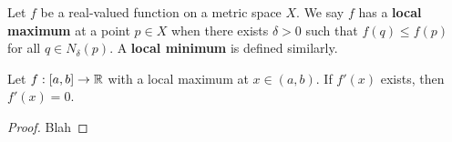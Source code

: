 \begin{definition} %
    Let $f$ be a real-valued function on a metric space $X$. We say $f$ has a \textbf{local maximum} at a point $p \in X$ when there exists $\delta > 0$ such that $f(q) \le f(p)$ for all $q \in N_\delta(p)$. A \textbf{local minimum} is defined similarly.
\end{definition}

\begin{theorem} %
    Let $f: [a, b] \rightarrow \mathbb{R}$ with a local maximum at $x \in (a, b)$. If $f'(x)$ exists, then $f'(x) = 0$.

    \begin{proof}
        Blah
    \end{proof}
\end{theorem}
